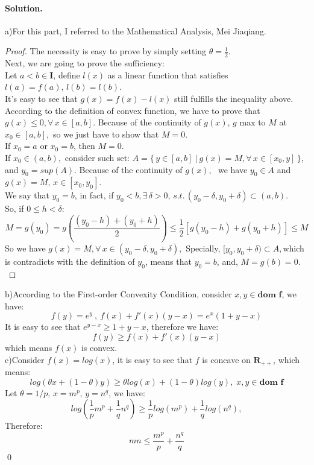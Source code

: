 \documentclass[a4paper]{article}
\newenvironment{solution}
{\color{blue} \paragraph{Solution.\\}}
{\newline \qed}
\begin{document}
\begin{solution}
	a)\;For this part, I referred to the Mathematical Analysis, Mei Jiaqiang.
	\begin{proof}The necessity is easy to prove by simply setting $\theta = \frac{1}{2}$.  \\ Next, we are going to prove the sufficiency:\\	
   Let $a<b \in \mathbf{I}$, define $l(x)$ as a linear function that satisfies $l(a)=f(a),\,l(b)=l(b)$.\\It's easy to see that $g(x) = f(x) - l(x)$ still fulfills the inequality above. According to the definition of convex function, we have to prove that $g(x)\leq 0, \forall\,x \in [a,b]$. Because of the continuity of $g(x),\,g$ max to $M$ at $x_0 \in [a,b],$ so we just have to show that $M=0$. \\If $x_0=a$ or $x_0=b$, then $M=0.$
\\If $x_0 \in (a,b),$ consider such set: $A = \{\,y \in [a,b]~|~g(x) = M, \forall\,x \in [x_0,y]\,\}$, and $y_0=sup(A)$. Because of the continuity of $g(x),\,\,$ we have $y_0 \in A$ and $g(x)=M,\,x \in [x_0,y_0]$. \\We say that $y_0=b$, in fact, if $y_0<b, \exists\, \delta > 0,\,s.t.\,(y_0-\delta,y_0+\delta) \subset (a,b).$\\ So, if $0 \leq h < \delta:$
\begin{equation}\nonumber
M = g(y_0) = g\left(\frac{(y_0-h)+(y_0+h)}{2}\right) \leq \frac{1}{2}\left[g(y_0-h)+g(y_0+h)\right] \leq M
\end{equation}
So we have $g(x)=M, \forall\,x\in(y_0-\delta,y_0+\delta),$ Specially, $[y_0,y_0+\delta)\subset A,$which is contradicts with the definition of $y_0$, means that $y_0=b$, and, $M=g(b)=0.$\\ 
	\end{proof} 
	b)\;According to the First-order Convexity Condition, consider $x,y\in\textbf{dom f}$, we have:
	\begin{equation}\nonumber
	f(y)=e^y \ ,\ f(x)+f'(x)(y-x)=e^x(1+y-x)
	\end{equation}	 It is easy to see that $e^{y-x} \geq 1+y-x$, therefore we have:
	\begin{equation}\nonumber
	f(y) \geq f(x)+f'(x)(y-x)
	\end{equation}	which means $f(x)$ is convex.\\
	c)\;Consider $f(x)=log(x)$, it is easy to see that $f$ is concave on $\mathbf{R_{++}}$, which means:
	\begin{equation}\nonumber
	log(\theta x+(1-\theta)y) \geq \theta log(x)+(1-\theta)log(y),\;x,y\in\textbf{dom f}
	\end{equation}	Let $\theta=1/p,\,x=m^p,\,y=n^q$, we have:
	\begin{equation}\nonumber
	log(\frac{1}{p} m^p+ \frac{1}{q} n^q) \geq \frac{1}{p} log(m^p)+\frac{1}{q}log(n^q),
	\end{equation} Therefore:
	\begin{equation}\nonumber
	mn \leq \frac{m^p}{p}+\frac{n^q}{q}
	\end{equation}
\end{solution}
\end{document}
